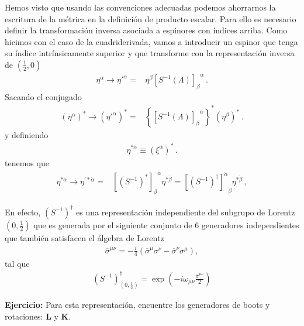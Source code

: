 \begin{frame}
Hemos visto que usando las convenciones adecuadas podemos ahorrarnos
la escritura de la métrica en la definición de producto escalar.
%
Para ello es necesario definir la transformación inversa asociada a
espinores con índices arriba. Como hicimos con el caso de la cuadriderivada, vamos a introducir un espinor que tenga su índice intrínsicamente superior y que transforme con la representación inversa de $(\frac{1}{2},0)$
\begin{align*}
  \eta^{\alpha}\to {\eta'}^{\alpha} =&\eta^\beta{\left[  S^{-1}(\Lambda)  \right]_{\beta}}^{\alpha}\,.
\end{align*}
Sacando el conjugado
\begin{align}
 \left( \eta^{\alpha} \right)^{*}\to \left( {\eta'}^{\alpha} \right)^{*} =&\left\{ {\left[  S^{-1}(\Lambda)  \right]_{\beta}}^{\alpha} \right\}^{*} \left( \eta^\beta \right)^{*}\,.
\end{align}
y definiendo
\begin{align}
\eta^{*\dot{\alpha}}\equiv  \left( \xi^{\alpha} \right)^{*}\,.
\end{align}
tenemos que
\begin{align*}
  \eta^{*\dot{\alpha}}\to \eta^{\prime *\dot{\alpha}}
  =& {\left[ \left( S^{-1} \right)^{*} \right]_{\dot{\beta}}}^{\dot{\alpha}}\eta^{*\dot{\beta}}={\left[ \left( S^{-1} \right)^{\dagger} \right]^{\dot{\alpha}}}_{\dot{\beta}}\eta^{*\dot{\beta}}\,,
\end{align*}

En efecto, $\left( S^{-1} \right)^{\dagger}$ es una representación independiente del subgrupo de Lorentz $(0,\frac{1}{2})$ que es generada por el siguiente conjunto de 6 generadores independientes que también satisfacen el álgebra de Lorentz
\begin{align*}
  \overline{\sigma}^{\mu\nu}=-\frac{i}{4} \left( \overline{\sigma}^{\mu}\sigma^{\nu}-\overline{\sigma}^{\nu}\sigma^{\mu} \right),
\end{align*}
tal que
\begin{align*}
\left( S^{-1} \right)^{\dagger}_{(0,\frac{1}{2})}=\exp \left( -i \omega_{\mu\nu} \frac{\overline{\sigma}^{\mu\nu}}{2} \right)
\end{align*}

\textbf{Ejercicio:} Para esta representación, encuentre los generadores de boots y rotaciones: $\boldsymbol{L}$ y $\boldsymbol{K}$.

\bigskip


\end{frame}

